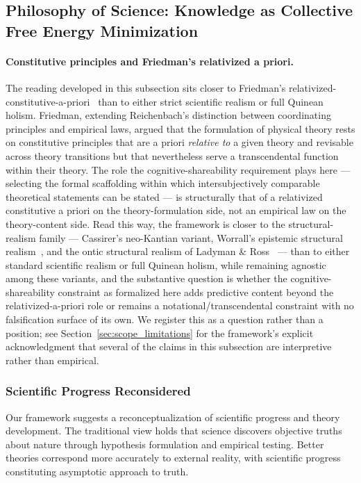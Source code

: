 \documentclass[11pt]{article}
\begin{document}
\subsection{Philosophy of Science: Knowledge as Collective Free Energy Minimization}
\label{sec:knowledge_collective_fem}

\paragraph{Constitutive principles and Friedman's relativized a priori.} The reading developed in this subsection sits closer to Friedman's relativized-constitutive-a-priori~\cite{Friedman2001} than to either strict scientific realism or full Quinean holism. Friedman, extending Reichenbach's distinction between coordinating principles and empirical laws, argued that the formulation of physical theory rests on constitutive principles that are a priori \emph{relative to} a given theory and revisable across theory transitions but that nevertheless serve a transcendental function within their theory. The role the cognitive-shareability requirement plays here — selecting the formal scaffolding within which intersubjectively comparable theoretical statements can be stated — is structurally that of a relativized constitutive a priori on the theory-formulation side, not an empirical law on the theory-content side. Read this way, the framework is closer to the structural-realism family — Cassirer's neo-Kantian variant, Worrall's epistemic structural realism~\cite{Worrall1989}, and the ontic structural realism of Ladyman \& Ross~\cite{Ladyman2007} — than to either standard scientific realism or full Quinean holism, while remaining agnostic among these variants, and the substantive question is whether the cognitive-shareability constraint as formalized here adds predictive content beyond the relativized-a-priori role or remains a notational/transcendental constraint with no falsification surface of its own. We register this as a question rather than a position; see Section~\ref{sec:scope_limitations} for the framework's explicit acknowledgment that several of the claims in this subsection are interpretive rather than empirical.


\subsubsection{Scientific Progress Reconsidered}

Our framework suggests a reconceptualization of scientific progress and theory development. The traditional view holds that science discovers objective truths about nature through hypothesis formulation and empirical testing. Better theories correspond more accurately to external reality, with scientific progress constituting asymptotic approach to truth.
\end{document}
